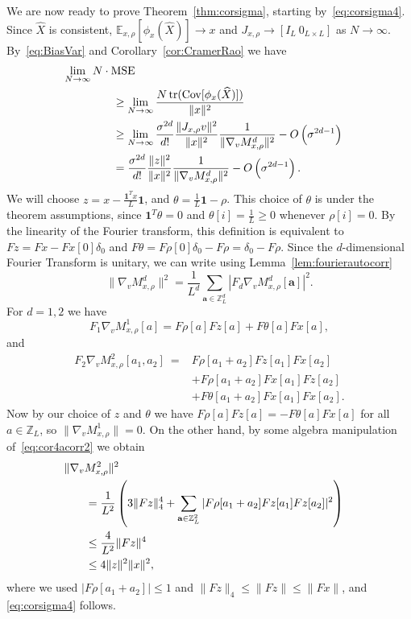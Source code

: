 \documentclass{IEEEtran}
\numberwithin{equation}{section}
\numberwithin{figure}{section}
\theoremstyle{plain}
\theoremstyle{definition}
\theoremstyle{remark}
\theoremstyle{plain}
\theoremstyle{remark}
\theoremstyle{plain}
\theoremstyle{plain}
\theoremstyle{remark}
\newcommand{\E}{\mathbb{E}}
\newcommand{\F}{F}
\DeclareMathOperator*{\tr}{tr}
\DeclareMathOperator*{\Cov}{Cov}
\newcommand{\Z}{{\mathbb{Z}}}
\newcommand{\MSE}{\mathrm{MSE}}
\newcommand{\OO}{{O}}
\newcommand{\ones}{{\mathbf{1}}}
\def\aa{\mathbf{a}}
\begin{document}
We are now ready to prove Theorem~\ref{thm:corsigma}, starting by~\eqref{eq:corsigma4}. Since $\widehat X$ is consistent, $\E_{x,\rho}[\phi_{x}(\widehat X)]\rightarrow x$ and $J_{x,\rho}\rightarrow [I_L ~0_{L\times L}]$ as $N\rightarrow \infty$. By~\eqref{eq:BiasVar} and Corollary~\ref{cor:CramerRao} we have
\begin{align}
\nonumber \lim_{N\rightarrow \infty}N\cdot \MSE \hspace{-20pt}\\
\label{eq:unbiased1}&\ge\lim_{N\rightarrow \infty}\frac{N\tr(\Cov[\phi_x(\widehat X)])}{\|x\|^2}\\
\nonumber &\ge \lim_{N\rightarrow \infty} \frac{\sigma^{2d}}{d!}\frac{\|J_{x,\rho}v\|^2}{\|x\|^2}\frac1{\|\nabla_v M^d_{x,\rho} \|^2} - \OO\left(\sigma^{2d-1}\right)\\
&= \frac{\sigma^{2d}}{d!}\frac{\|z\|^2}{\|x\|^2}\frac1{\|\nabla_v M^d_{x,\rho} \|^2} - \OO\left(\sigma^{2d-1}\right).
\end{align}
We will choose $z=x-\frac{\ones^Tx}L \ones$, and $\theta=\frac1L\ones-\rho$. This choice of $\theta$ is under the theorem assumptions, since $\ones^T \theta=0$ and $\theta[i]=\frac1L\ge 0$ whenever $\rho[i]= 0$. By the linearity of the Fourier transform, this definition is equivalent to $\F z=\F x-\F x[0]\delta_0$ and $\F \theta=\F \rho [0]\delta_0-\F \rho=\delta_0-\F \rho$. Since the $d$-dimensional Fourier Transform is unitary, we can write using Lemma~\ref{lem:fourierautocorr} 
\begin{equation}\label{eq:corfouriereq}
\|\nabla_v M^d_{x,\rho} \|^2=
\frac1{L^d}\sum_{\aa\in\Z_L^d}|\F_d\nabla_v M^d_{x,\rho}[\aa]|^2.
\end{equation}
For $d=1,2$ we have
\begin{equation*}
\F_1\nabla_v M^1_{x,\rho}[a]=\F\rho[a]\F z[a]+\F\theta[a] \F x[a],
\end{equation*}
and 
\begin{align}
\F_2\nabla_v M^2_{x,\rho}[a_1,a_2]\
\nonumber =&\F \rho\left[a_1+a_2\right]\F z[a_1]\F x[a_2]\\
\nonumber &+\F \rho\left[a_1+a_2\right]\F x[a_1]\F z[a_2]\\
\label{eq:cor4acorr2} &+\F \theta\left[a_1+a_2\right] \F x[a_1]\F x[a_2].
\end{align}
Now by our choice of $z$ and $\theta$ we have $\F\rho[a]\F z[a]=-\F\theta[a] \F x[a]$ for all $a\in \Z_L$, so $\|\nabla_v M^1_{x,\rho} \|=0$. On the other hand, by some algebra manipulation of~\eqref{eq:cor4acorr2} we obtain
\begin{align*}
\|\nabla_v M^2_{x,\rho} \|^2\hspace{-30pt}\\
&=\frac{1}{L^2}\left(3\|\F z\|_4^4+\sum_{\aa\in\Z_L^2}|\F\rho[a_1+a_2]\F z[a_1]\F z[a_2]|^2\right)\\
&\le \frac{4}{L^2} \|\F z\|^4\\
&\le 4\|z\|^2\|x\|^2,
\end{align*}
where we used $|\F\rho[a_1+a_2]|\le 1$ and $\|\F z\|_4\le \|\F z\|\le \|\F x\|$, and \eqref{eq:corsigma4} follows.
\end{document}
